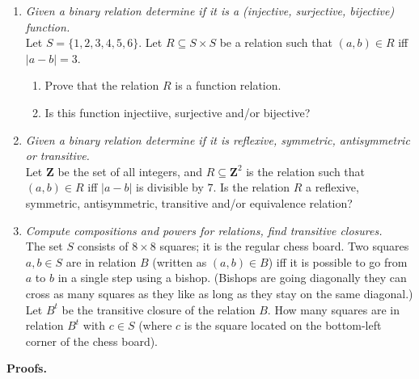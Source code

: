 \documentclass[a4paper,12pt]{article}
\newcommand\Z{\mathbf{Z}}
\begin{document}
\begin{enumerate}
\item {\small \em Given a binary relation determine if it is a (injective, surjective, bijective) function.}\\
Let $S = \{ 1,2,3,4,5,6 \}$. Let $R \subseteq S \times S$ be a relation such that
$(a,b) \in R$ iff $|a - b| = 3$.
\begin{enumerate}
\item
Prove that the relation $R$ is a function relation.
\item
Is this function injectiive, surjective and/or bijective?
\end{enumerate}

\item {\small \em Given a binary relation determine if it is reflexive, symmetric, antisymmetric or transitive.}\\
Let $\Z$ be the set of all integers, and $R \subseteq \Z^2$ is the relation
such that $(a,b) \in R$ iff $|a - b|$ is divisible by $7$.
Is the relation $R$ a reflexive, symmetric, antisymmetric, transitive and/or equivalence relation?



\item {\small \em Compute compositions and powers for relations, find transitive closures.}\\
The set $S$ consists of $8 \times 8$ squares; it is the regular chess board.
Two squares $a,b \in S$ are in relation $B$ (written as $(a,b) \in B$) iff
it is possible to go from $a$ to $b$ in a single step using a bishop.
(Bishops are going diagonally \textendash{} they can cross as many squares as they like as long as they
stay on the same diagonal.) Let $B^t$ be the transitive closure of the relation $B$.
How many squares are in relation $B^t$ with $c \in S$ (where $c$ is the
square located on the bottom-left corner of the chess board).
\end{enumerate}



\vspace{10pt}
{\bf Proofs.}
\end{document}
